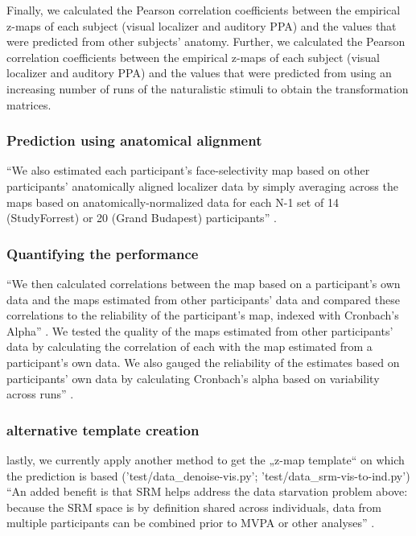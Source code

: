 
Finally, we calculated the Pearson correlation coefficients between the
empirical z-maps of each subject (visual localizer and auditory PPA) and the
values that were predicted from other subjects' anatomy.
%
Further, we calculated the Pearson correlation coefficients between the
empirical z-maps of each subject (visual localizer and auditory PPA) and the
values that were predicted from using an increasing number of runs of the
naturalistic stimuli to obtain the transformation matrices.


\subsubsection{Prediction using anatomical alignment}
%
``We also estimated each participant's face-selectivity map based on other
participants' anatomically aligned localizer data by simply averaging across the
maps based on anatomically-normalized data for each N-1 set of 14 (StudyForrest)
or 20 (Grand Budapest) participants'' \citep{jiahui2020predicting}.


\subsubsection{Quantifying the performance}

``We then calculated correlations between the map based on a participant’s own
data and the maps estimated from other participants' data and compared these
correlations to the reliability of the participant's map, indexed with
Cronbach's Alpha'' \citep{jiahui2020predicting}.
%
We tested the quality of the maps estimated from other participants' data by
calculating the correlation of each with the map estimated from a participant's
own data. We also gauged the reliability of the estimates based on
participants' own data by calculating Cronbach's alpha based on variability
across runs'' \citep{jiahui2020predicting}.


\subsubsection{alternative template creation}
%
lastly, we currently apply another method to get the „z-map template“ on which
the prediction is based ('test/data\_denoise-vis.py';
'test/data\_srm-vis-to-ind.py')
%
``An added benefit is that SRM helps address the data starvation problem above:
because the SRM space is by definition shared across individuals, data from
multiple participants can be combined prior to MVPA or other analyses''
\citep{cohen2017computational}.


